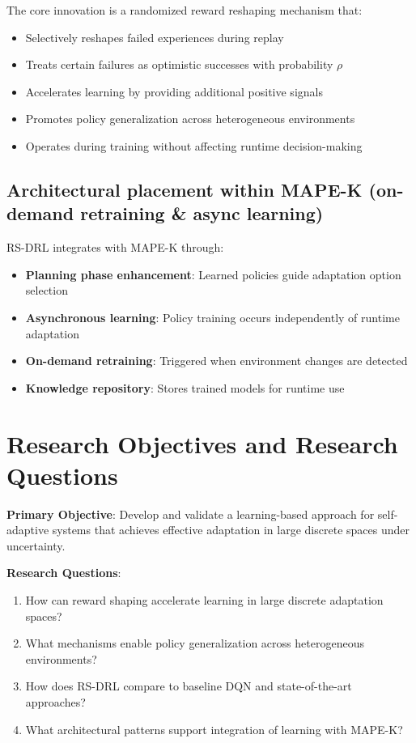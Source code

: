 \documentclass[11pt,a4paper]{article}
\begin{document}
The core innovation is a randomized reward reshaping mechanism that:
\begin{itemize}
    \item Selectively reshapes failed experiences during replay
    \item Treats certain failures as optimistic successes with probability $\rho$
    \item Accelerates learning by providing additional positive signals
    \item Promotes policy generalization across heterogeneous environments
    \item Operates during training without affecting runtime decision-making
\end{itemize}

\subsection{Architectural placement within MAPE-K (on-demand retraining \& async learning)}

RS-DRL integrates with MAPE-K through:
\begin{itemize}
    \item \textbf{Planning phase enhancement}: Learned policies guide adaptation option selection
    \item \textbf{Asynchronous learning}: Policy training occurs independently of runtime adaptation
    \item \textbf{On-demand retraining}: Triggered when environment changes are detected
    \item \textbf{Knowledge repository}: Stores trained models for runtime use
\end{itemize}

\section{Research Objectives and Research Questions}

\textbf{Primary Objective}: Develop and validate a learning-based approach for self-adaptive systems that achieves effective adaptation in large discrete spaces under uncertainty.

\textbf{Research Questions}:
\begin{enumerate}
    \item How can reward shaping accelerate learning in large discrete adaptation spaces?
    \item What mechanisms enable policy generalization across heterogeneous environments?
    \item How does RS-DRL compare to baseline DQN and state-of-the-art approaches?
    \item What architectural patterns support integration of learning with MAPE-K?
\end{enumerate}
\end{document}
